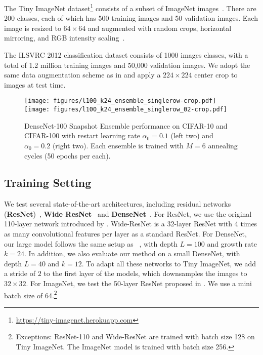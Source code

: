 The Tiny ImageNet dataset\footnote{\url{https://tiny-imagenet.herokuapp.com}} consists of a subset of ImageNet images~\citep{deng2009imagenet}. There are 200 classes, each of which has 500 training images and 50 validation images. Each image is resized to $64\times64$ and augmented with random crops, horizontal mirroring, and RGB intensity scaling~\citep{alexnet}.

 The ILSVRC 2012 classification dataset \citep{deng2009imagenet} consists of 1000 images classes, with a total of 1.2 million training images and 50,000 validation images. We adopt the same data augmentation scheme as in \citep{he2016deep,huang2016densely} and apply a $224\times 224$ center crop to images at test time.

 \begin{figure*}[t]
\centerline{
                \texttt{[image: figures/l100\_k24\_ensemble\_singlerow-crop.pdf]}
            \texttt{[image: figures/l100\_k24\_ensemble\_singlerow\_02-crop.pdf]}}
        \caption{\small DenseNet-100 Snapshot Ensemble performance on CIFAR-10 and CIFAR-100 with restart learning rate $\alpha_0=0.1$ (left two) and $\alpha_0=0.2$ (right two). Each ensemble is trained with $M\!=\!6$ annealing cycles (50 epochs per each).}
        \label{fig:free-ensemble-barplot}
        \vspace{-1em}
    \end{figure*}

\subsection{Training Setting}

 We test several state-of-the-art architectures, including residual networks ({\bf ResNet})~\citep{he2016deep}, {\bf Wide ResNet}~\citep{wide} and {\bf DenseNet}~\citep{huang2016densely}.
For ResNet, we use the original 110-layer network introduced by \cite{he2016deep}. Wide-ResNet is a 32-layer ResNet with 4 times as many convolutional features per layer as a standard ResNet. For DenseNet, our large model follows the same setup as ~\citep{huang2016densely}, with depth $L=100$ and growth rate $k=24$. In addition, we also evaluate our method on a small DenseNet, with depth $L=40$ and $k=12$. To adapt all these networks to Tiny ImageNet, we add a stride of $2$ to the first layer of the models, which downsamples the images to $32\times32$. For ImageNet, we test the 50-layer ResNet proposed in \citep{he2016deep}.
We use a mini batch size of 64.\footnote{Exceptions: ResNet-110 and Wide-ResNet are trained with batch size 128 on Tiny ImageNet. The ImageNet model is trained with batch size 256.}

